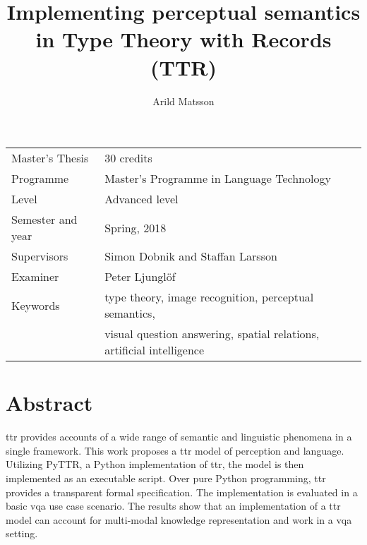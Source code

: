 \documentclass[11pt, a4paper]{article}
\title{Implementing perceptual semantics in Type Theory with Records (TTR)}
\author{Arild Matsson}
\date{}
\begin{document}
\begin{titlepage}

\maketitle

\vfill

\begingroup
\renewcommand*{\arraystretch}{1.2}
\begin{tabular}{l@{\hskip 20mm}l}
\hline
Master's Thesis & 30 credits\\
Programme & Master’s Programme in Language Technology\\
Level & Advanced level \\
Semester and year & Spring, 2018\\
Supervisors & Simon Dobnik and Staffan Larsson \\
Examiner & Peter Ljunglöf \\
Keywords & type theory, image recognition, perceptual semantics, \\
& visual question answering, spatial relations, artificial intelligence
\end{tabular}
\endgroup

\thispagestyle{empty}
\end{titlepage}

\newpage
\singlespacing
\glsresetall
\section*{Abstract}

\Gls{ttr} provides accounts of a wide range of semantic and linguistic phenomena in a single framework.
This work proposes a \gls{ttr} model of perception and language.
Utilizing PyTTR, a Python implementation of \gls{ttr}, the model is then implemented as an executable script.
Over pure Python programming, \gls{ttr} provides a transparent formal specification.
The implementation is evaluated in a basic \gls{vqa} use case scenario.
The results show that an implementation of a \gls{ttr} model can account for multi-modal knowledge representation and work in a \gls{vqa} setting.

\end{document}
